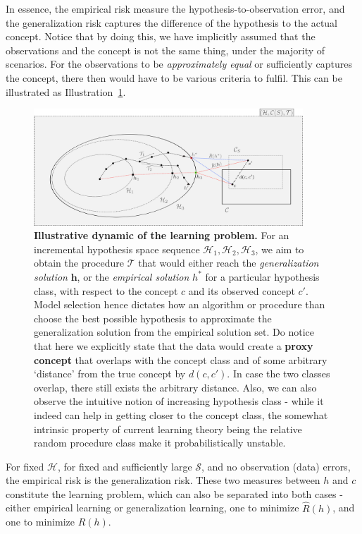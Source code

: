 \documentclass[10pt,oneside,oldfontcommands,dvipsnames,article]{memoir}
\begin{document}
In essence, the empirical risk measure the hypothesis-to-observation error, and the generalization risk captures the difference of the hypothesis to the actual concept. Notice that by doing this, we have implicitly assumed that the observations and the concept is not the same thing, under the majority of scenarios. For the observations to be \textit{approximately equal} or sufficiently captures the concept, there then would have to be various criteria to fulfil. This can be illustrated as Illustration~\ref{fig:statlearnclassical}. 
\begin{figure}[h!]
  \centering
  \includegraphics[width=0.9\textwidth]{img/testsubject1a.png}
  \caption{\textbf{Illustrative dynamic of the learning problem.} For an incremental hypothesis space sequence $\mathcal{H}_{1},\mathcal{H}_{2},\mathcal{H}_{3}$, we aim to obtain the procedure $\mathcal{T}$ that would either reach the \textit{generalization solution} $\bm{h}$, or the \textit{empirical solution} $h^{*}$ for a particular hypothesis class, with respect to the concept $c$ and its observed concept $c'$. Model selection hence dictates how an algorithm or procedure than choose the best possible hypothesis to approximate the generalization solution from the empirical solution set. Do notice that here we explicitly state that the data would create a \textbf{proxy concept} that overlaps with the concept class and of some arbitrary `distance' from the true concept by $d(c,c')$. In case the two classes overlap, there still exists the arbitrary distance. Also, we can also observe the intuitive notion of increasing hypothesis class - while it indeed can help in getting closer to the concept class, the somewhat intrinsic property of current learning theory being the relative random procedure class make it probabilistically unstable.}
  \label{fig:statlearnclassical}
\end{figure}

For fixed $\mathcal{H}$, for fixed and sufficiently large $\mathcal{S}$, and no observation (data) errors, the empirical risk is the generalization risk. These two measures between $h$ and $c$ constitute the learning problem, which can also be separated into both cases - either empirical learning or generalization learning, one to minimize $\hat{R}(h)$, and one to minimize $R(h)$. 
\end{document}
